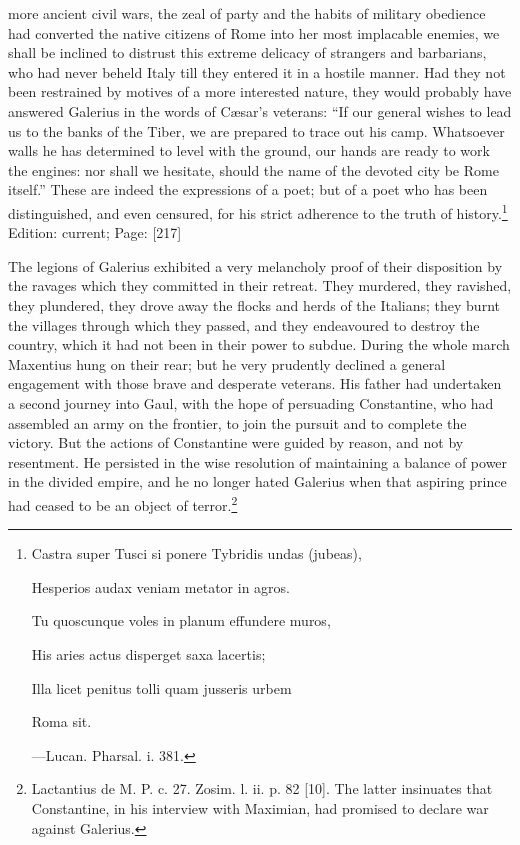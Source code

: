 more ancient civil wars, the zeal of party and the habits of military obedience had converted the native citizens of Rome into her most implacable enemies, we shall be inclined to distrust this extreme delicacy of strangers and barbarians, who had never beheld Italy till they entered it in a hostile manner. Had they not been restrained by motives of a more interested nature, they would probably have answered Galerius in the words of Cæsar\texthebrew{}’s veterans: \texthebrew{“}If our general wishes to lead us to the banks of the Tiber, we are prepared to trace out his camp. Whatsoever walls he has determined to level with the ground, our hands are ready to work the engines: nor shall we hesitate, should the name of the devoted city be Rome itself.\texthebrew{}” These are indeed the expressions of a poet; but of a poet who has been distinguished, and even censured, for his strict adherence to the truth of history.\footnote{Castra super Tusci si ponere Tybridis undas (jubeas),

Hesperios audax veniam metator in agros.

Tu quoscunque voles in planum effundere muros,

His aries actus disperget saxa lacertis;

Illa licet penitus tolli quam jusseris urbem

Roma sit.

\texthebrew{—}Lucan. Pharsal. i. 381.}
Edition: current; Page: [217]

The legions of Galerius exhibited a very melancholy proof of their disposition by the ravages which they committed in their retreat. They murdered, they ravished, they plundered, they drove away the flocks and herds of the Italians; they burnt the villages through which they passed, and they endeavoured to destroy the country, which it had not been in their power to subdue. During the whole march Maxentius hung on their rear; but he very prudently declined a general engagement with those brave and desperate veterans. His father had undertaken a second journey into Gaul, with the hope of persuading Constantine, who had assembled an army on the frontier, to join the pursuit and to complete the victory. But the actions of Constantine were guided by reason, and not by resentment. He persisted in the wise resolution of maintaining a balance of power in the divided empire, and he no longer hated Galerius when that aspiring prince had ceased to be an object of terror.\footnote{Lactantius de M. P. c. 27. Zosim. l. ii. p. 82 [10]. The latter insinuates that Constantine, in his interview with Maximian, had promised to declare war against Galerius.}

